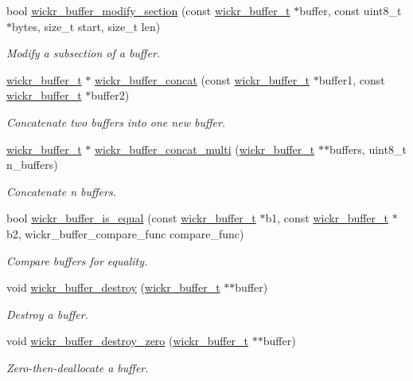 \begin{DoxyCompactItemize}
bool \hyperlink{group__wickr__buffer_ga67f817bf762e4ee401b31685197620be}{wickr\+\_\+buffer\+\_\+modify\+\_\+section} (const \hyperlink{structwickr__buffer}{wickr\+\_\+buffer\+\_\+t} $\ast$buffer, const uint8\+\_\+t $\ast$bytes, size\+\_\+t start, size\+\_\+t len)
\begin{DoxyCompactList}\small\item\em Modify a subsection of a buffer. \end{DoxyCompactList}\item 
\hyperlink{structwickr__buffer}{wickr\+\_\+buffer\+\_\+t} $\ast$ \hyperlink{group__wickr__buffer_gad7721c1033a1fc378a0a11613f3cfb26}{wickr\+\_\+buffer\+\_\+concat} (const \hyperlink{structwickr__buffer}{wickr\+\_\+buffer\+\_\+t} $\ast$buffer1, const \hyperlink{structwickr__buffer}{wickr\+\_\+buffer\+\_\+t} $\ast$buffer2)
\begin{DoxyCompactList}\small\item\em Concatenate two buffers into one new buffer. \end{DoxyCompactList}\item 
\hyperlink{structwickr__buffer}{wickr\+\_\+buffer\+\_\+t} $\ast$ \hyperlink{group__wickr__buffer_ga3aa7ea751a65310184d6c0ea9627dca8}{wickr\+\_\+buffer\+\_\+concat\+\_\+multi} (\hyperlink{structwickr__buffer}{wickr\+\_\+buffer\+\_\+t} $\ast$$\ast$buffers, uint8\+\_\+t n\+\_\+buffers)
\begin{DoxyCompactList}\small\item\em Concatenate n buffers. \end{DoxyCompactList}\item 
bool \hyperlink{group__wickr__buffer_ga51ec58848ab0b07d164c6f7d73200c24}{wickr\+\_\+buffer\+\_\+is\+\_\+equal} (const \hyperlink{structwickr__buffer}{wickr\+\_\+buffer\+\_\+t} $\ast$b1, const \hyperlink{structwickr__buffer}{wickr\+\_\+buffer\+\_\+t} $\ast$b2, wickr\+\_\+buffer\+\_\+compare\+\_\+func compare\+\_\+func)
\begin{DoxyCompactList}\small\item\em Compare buffers for equality. \end{DoxyCompactList}\item 
void \hyperlink{group__wickr__buffer_ga7ec1198db0739f3034ddd3969c64257f}{wickr\+\_\+buffer\+\_\+destroy} (\hyperlink{structwickr__buffer}{wickr\+\_\+buffer\+\_\+t} $\ast$$\ast$buffer)
\begin{DoxyCompactList}\small\item\em Destroy a buffer. \end{DoxyCompactList}\item 
void \hyperlink{group__wickr__buffer_gaf0ff6486debbfd676b7675f6f899fc40}{wickr\+\_\+buffer\+\_\+destroy\+\_\+zero} (\hyperlink{structwickr__buffer}{wickr\+\_\+buffer\+\_\+t} $\ast$$\ast$buffer)
\begin{DoxyCompactList}\small\item\em Zero-\/then-\/deallocate a buffer. \end{DoxyCompactList}\end{DoxyCompactItemize}


